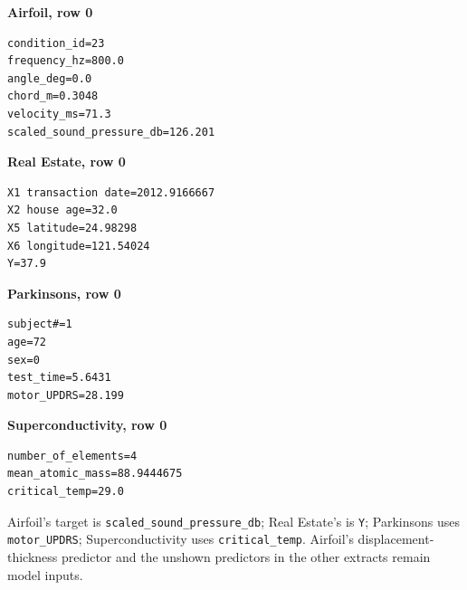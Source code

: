 \begingroup
\footnotesize
\noindent\textbf{Airfoil, row 0}
\begin{verbatim}
condition_id=23
frequency_hz=800.0
angle_deg=0.0
chord_m=0.3048
velocity_ms=71.3
scaled_sound_pressure_db=126.201
\end{verbatim}
\textbf{Real Estate, row 0}
\begin{verbatim}
X1 transaction date=2012.9166667
X2 house age=32.0
X5 latitude=24.98298
X6 longitude=121.54024
Y=37.9
\end{verbatim}
\textbf{Parkinsons, row 0}
\begin{verbatim}
subject#=1
age=72
sex=0
test_time=5.6431
motor_UPDRS=28.199
\end{verbatim}
\textbf{Superconductivity, row 0}
\begin{verbatim}
number_of_elements=4
mean_atomic_mass=88.9444675
critical_temp=29.0
\end{verbatim}
\endgroup

Airfoil's target is \texttt{scaled\_sound\_pressure\_db}; Real Estate's is \texttt{Y}; Parkinsons uses \texttt{motor\_UPDRS}; Superconductivity uses \texttt{critical\_temp}.
Airfoil's displacement-thickness predictor and the unshown predictors in the other extracts remain model inputs.
